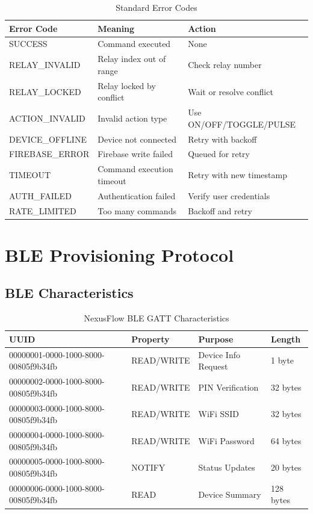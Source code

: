 \begin{table}[H]
\centering
\caption{Standard Error Codes}
\label{tbl:error_codes}
\begin{tabular}{|l|l|l|}
\hline
\textbf{Error Code} & \textbf{Meaning} & \textbf{Action} \\
\hline
SUCCESS & Command executed & None \\
\hline
RELAY\_INVALID & Relay index out of range & Check relay number \\
\hline
RELAY\_LOCKED & Relay locked by conflict & Wait or resolve conflict \\
\hline
ACTION\_INVALID & Invalid action type & Use ON/OFF/TOGGLE/PULSE \\
\hline
DEVICE\_OFFLINE & Device not connected & Retry with backoff \\
\hline
FIREBASE\_ERROR & Firebase write failed & Queued for retry \\
\hline
TIMEOUT & Command execution timeout & Retry with new timestamp \\
\hline
AUTH\_FAILED & Authentication failed & Verify user credentials \\
\hline
RATE\_LIMITED & Too many commands & Backoff and retry \\
\hline
\end{tabular}
\end{table}

\section{BLE Provisioning Protocol}

\subsection{BLE Characteristics}

\begin{table}[H]
\centering
\caption{NexusFlow BLE GATT Characteristics}
\label{tbl:ble_characteristics}
\begin{tabular}{|l|l|l|l|}
\hline
\textbf{UUID} & \textbf{Property} & \textbf{Purpose} & \textbf{Length} \\
\hline
00000001-0000-1000-8000-00805f9b34fb & READ/WRITE & Device Info Request & 1 byte \\
\hline
00000002-0000-1000-8000-00805f9b34fb & READ/WRITE & PIN Verification & 32 bytes \\
\hline
00000003-0000-1000-8000-00805f9b34fb & READ/WRITE & WiFi SSID & 32 bytes \\
\hline
00000004-0000-1000-8000-00805f9b34fb & READ/WRITE & WiFi Password & 64 bytes \\
\hline
00000005-0000-1000-8000-00805f9b34fb & NOTIFY & Status Updates & 20 bytes \\
\hline
00000006-0000-1000-8000-00805f9b34fb & READ & Device Summary & 128 bytes \\
\hline
\end{tabular}
\end{table}

